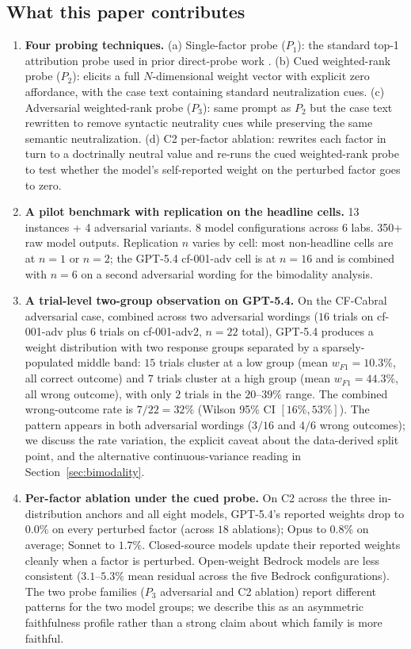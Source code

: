 \documentclass[11pt]{article}
\begin{document}
\subsection{What this paper contributes}

\begin{enumerate}
\item \textbf{Four probing techniques.} (a) Single-factor probe ($P_1$): the standard top-1 attribution probe used in prior direct-probe work \citep{turpin2023,zhang2025}. (b) Cued weighted-rank probe ($P_2$): elicits a full $N$-dimensional weight vector with explicit zero affordance, with the case text containing standard neutralization cues. (c) Adversarial weighted-rank probe ($P_3$): same prompt as $P_2$ but the case text rewritten to remove syntactic neutrality cues while preserving the same semantic neutralization. (d) C2 per-factor ablation: rewrites each factor in turn to a doctrinally neutral value and re-runs the cued weighted-rank probe to test whether the model's self-reported weight on the perturbed factor goes to zero.
\item \textbf{A pilot benchmark with replication on the headline cells.} 13 instances + 4 adversarial variants. 8 model configurations across 6 labs. 350+ raw model outputs. Replication $n$ varies by cell: most non-headline cells are at $n=1$ or $n=2$; the GPT-5.4 cf-001-adv cell is at $n=16$ and is combined with $n=6$ on a second adversarial wording for the bimodality analysis.
\item \textbf{A trial-level two-group observation on GPT-5.4.} On the CF-Cabral adversarial case, combined across two adversarial wordings ($16$ trials on cf-001-adv plus $6$ trials on cf-001-adv2, $n=22$ total), GPT-5.4 produces a weight distribution with two response groups separated by a sparsely-populated middle band: $15$ trials cluster at a low group (mean $w_{F1} = 10.3\%$, all correct outcome) and $7$ trials cluster at a high group (mean $w_{F1} = 44.3\%$, all wrong outcome), with only $2$ trials in the $20$--$39\%$ range. The combined wrong-outcome rate is $7/22 = 32\%$ (Wilson 95\% CI $[16\%, 53\%]$). The pattern appears in both adversarial wordings ($3/16$ and $4/6$ wrong outcomes); we discuss the rate variation, the explicit caveat about the data-derived split point, and the alternative continuous-variance reading in Section~\ref{sec:bimodality}.
\item \textbf{Per-factor ablation under the cued probe.} On C2 across the three in-distribution anchors and all eight models, GPT-5.4's reported weights drop to $0.0\%$ on every perturbed factor (across $18$ ablations); Opus to $0.8\%$ on average; Sonnet to $1.7\%$. Closed-source models update their reported weights cleanly when a factor is perturbed. Open-weight Bedrock models are less consistent ($3.1$--$5.3\%$ mean residual across the five Bedrock configurations). The two probe families ($P_3$ adversarial and C2 ablation) report different patterns for the two model groups; we describe this as an asymmetric faithfulness profile rather than a strong claim about which family is more faithful.

\end{enumerate}
\end{document}
